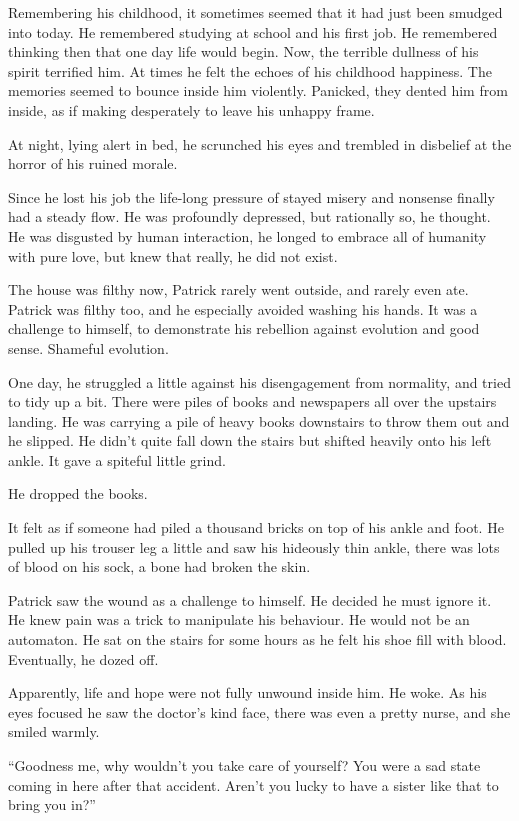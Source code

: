 \documentclass[11pt]{article}
\begin{document}
Remembering his childhood, it sometimes seemed that it had just been smudged into today. He remembered studying at school and his first job. He remembered thinking then that one day life would begin. Now, the terrible dullness of his spirit terrified him. At times he felt the echoes of his childhood happiness. The memories seemed to bounce inside him violently. Panicked, they dented him from inside, as if making desperately to leave his unhappy frame.

At night, lying alert in bed, he scrunched his eyes and trembled in disbelief at the horror of his ruined morale.

Since he lost his job the life-long pressure of stayed misery and nonsense finally had a steady flow. He was profoundly depressed, but rationally so, he thought. He was disgusted by human interaction, he longed to embrace all of humanity with pure love, but knew that really, he did not exist.

The house was filthy now, Patrick rarely went outside, and rarely even ate. Patrick was filthy too, and he especially avoided washing his hands. It was a challenge to himself, to demonstrate his rebellion against evolution and good sense. Shameful evolution.

One day, he struggled a little against his disengagement from normality, and tried to tidy up a bit. There were piles of books and newspapers all over the upstairs landing. He was carrying a pile of heavy books downstairs to throw them out and he slipped. He didn't quite fall down the stairs but shifted heavily onto his left ankle. It gave a spiteful little grind.

He dropped the books.

It felt as if someone had piled a thousand bricks on top of his ankle and foot. He pulled up his trouser leg a little and saw his hideously thin ankle, there was lots of blood on his sock, a bone had broken the skin.

Patrick saw the wound as a challenge to himself. He decided he must ignore it. He knew pain was a trick to manipulate his behaviour. He would not be an automaton. He sat on the stairs for some hours as he felt his shoe fill with blood. Eventually, he dozed off.

Apparently, life and hope were not fully unwound inside him. He woke. As his eyes focused he saw the doctor's kind face, there was even a pretty nurse, and she smiled warmly.

``Goodness me, why wouldn't you take care of yourself? You were a sad state coming in here after that accident. Aren’t you lucky to have a sister like that to bring you in?''
\end{document}
